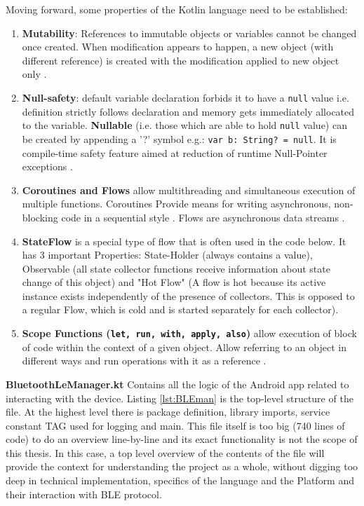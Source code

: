 Moving forward, some properties of the Kotlin language need to be established:
\begin{enumerate}
	\item \textbf{Mutability}: References to immutable objects or variables cannot be changed once created. When modification appears to happen, a new object (with different reference) is created with the modification applied to new object only \cite{kotlin_variables} \cite{kotlin_collections}.
	\item \textbf{Null-safety}: default variable declaration forbids it to have a \texttt{null} value i.e. definition strictly follows declaration and memory gets immediately allocated to the variable. \textbf{Nullable} (i.e. those which are able to hold \texttt{null} value) can be created by appending a '?' symbol e.g.: \texttt{var b: String? = null}. It is  compile-time safety feature aimed at reduction of runtime Null-Pointer exceptions \cite{kotlin_null_safety}.
	\item \textbf{Coroutines and Flows} allow multithreading and simultaneous execution of multiple functions. Coroutines Provide means for writing asynchronous, non-blocking code in a sequential style \cite{kotlin_coroutines}. Flows are asynchronous data streams \cite{kotlin_flow}. 
	\item \textbf{StateFlow} is a special type of flow that is often used in the code below. It has 3 important Properties: State-Holder (always contains a value), Observable (all state collector functions receive information about state change of this object) and "Hot Flow" (A flow is hot because its active instance exists independently of the presence of collectors. This is opposed to a regular Flow, which is cold and is started separately for each collector)\cite{jetbrains_stateflow}.
	\item \textbf{Scope Functions (\texttt{let, run, with, apply, also})} allow execution of block of code within the context of a given object. Allow referring to an object in different ways and run operations with it as a reference \cite{kotlin_scope_functions}.
\end{enumerate}

\textbf{BluetoothLeManager.kt} Contains all the logic of the Android app related to interacting with the device. Listing \ref{lst:BLEman} is the top-level structure of the file. At the highest level there is package definition, library imports, service constant TAG used for logging and main. This file itself is too big (740 lines of code) to do an overview line-by-line and its exact functionality is not the scope of this thesis. In this case, a top level overview of the contents of the file will provide the context for understanding the project as a whole, without digging too deep in technical implementation, specifics of the language and the Platform and their interaction with \ac{BLE} protocol.

